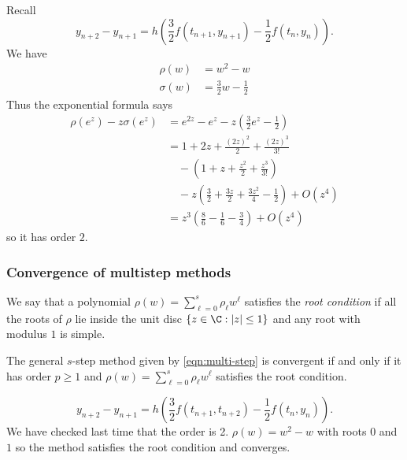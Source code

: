 \documentclass[a4paper]{article}
\begin{document}
\begin{eg}
  Recall
  \[
    y_{n + 2} - y_{n + 1} = h \left( \frac{3}{2}f(t_{n + 1}, y_{n + 1}) - \frac{1}{2}f(t_n, y_n) \right).
  \]
  We have
  \begin{align*}
    \rho(w) &= w^2 - w \\
    \sigma(w) &= \frac{3}{2}w - \frac{1}{2}
  \end{align*}
  Thus the exponential formula says
  \begin{align*}
    \rho(e^z) -z\sigma(e^z)
    &= e^{2z} - e^z - z (\frac{3}{2}e^z - \frac{1}{2}) \\
    &= 1 + 2z + \frac{(2z)^2}{2} + \frac{(2z)^3}{3!} \\
    &\quad - (1 + z + \frac{z^2}{2} + \frac{z^3}{3!}) \\
    &\quad -z(\frac{3}{2} + \frac{3z}{2} + \frac{3z^2}{4} - \frac{1}{2}) + O(z^4) \\
    &= z^3(\frac{8}{6} - \frac{1}{6} - \frac{3}{4}) + O(z^4)
  \end{align*}
  so it has order \(2\).
\end{eg}

\subsubsection{Convergence of multistep methods}

\begin{definition}
  We say that a polynomial \(\rho(w) = \sum_{\ell = 0}^s \rho_\ell w^\ell\) satisfies the \emph{root condition} if all the roots of \(\rho\) lie inside the unit disc \(\{z \in \C: |z| \leq 1\}\) and any root with modulus \(1\) is simple.
\end{definition}

\begin{theorem}
  The general \(s\)-step method given by \eqref{eqn:multi-step} is convergent if and only if it has order \(p \geq 1\) and \(\rho(w) = \sum_{\ell = 0}^s \rho_\ell w^\ell\) satisfies the root condition.
\end{theorem}

\begin{eg}
  \[
    y_{n + 2} - y_{n + 1} = h \left( \frac{3}{2} f(t_{n + 1}, t_{n + 2}) - \frac{1}{2}f(t_n, y_n) \right).
  \]
  We have checked last time that the order is 2. \(\rho(w) = w^2 - w\) with roots \(0\) and \(1\) so the method satisfies the root condition and converges.
\end{eg}
\end{document}
